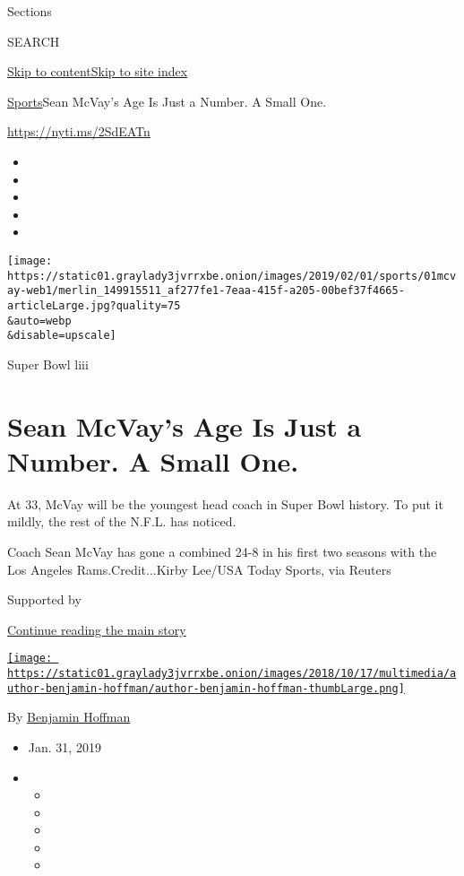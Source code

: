 Sections

SEARCH

\protect\hyperlink{site-content}{Skip to
content}\protect\hyperlink{site-index}{Skip to site index}

\href{/section/sports}{Sports}\textbar{}Sean McVay's Age Is Just a
Number. A Small One.

\url{https://nyti.ms/2SdEATn}

\begin{itemize}
\item
\item
\item
\item
\item
\end{itemize}

\texttt{[image: https://static01.graylady3jvrrxbe.onion/images/2019/02/01/sports/01mcvay-web1/merlin\_149915511\_af277fe1-7eaa-415f-a205-00bef37f4665-articleLarge.jpg?quality=75\\\&auto=webp\\\&disable=upscale]}

Super Bowl liii

\hypertarget{sean-mcvays-age-is-just-a-number-a-small-one}{%
\section{Sean McVay's Age Is Just a Number. A Small
One.}\label{sean-mcvays-age-is-just-a-number-a-small-one}}

At 33, McVay will be the youngest head coach in Super Bowl history. To
put it mildly, the rest of the N.F.L. has noticed.

Coach Sean McVay has gone a combined 24-8 in his first two seasons with
the Los Angeles Rams.Credit...Kirby Lee/USA Today Sports, via Reuters

Supported by

\protect\hyperlink{after-sponsor}{Continue reading the main story}

\href{https://www.nytimes3xbfgragh.onion/by/benjamin-hoffman}{\texttt{[image: https://static01.graylady3jvrrxbe.onion/images/2018/10/17/multimedia/author-benjamin-hoffman/author-benjamin-hoffman-thumbLarge.png]}}

By
\href{https://www.nytimes3xbfgragh.onion/by/benjamin-hoffman}{Benjamin
Hoffman}

\begin{itemize}
\item
  Jan. 31, 2019
\item
  \begin{itemize}
  \item
  \item
  \item
  \item
  \item
  \end{itemize}
\end{itemize}

